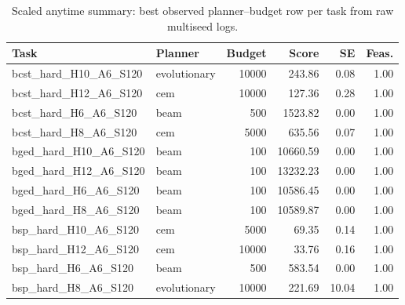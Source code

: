 \begin{table}[t]
\centering
\scriptsize
\caption{Scaled anytime summary: best observed planner--budget row per task from raw multiseed logs.}
\label{tab:scaling_anytime_bounds}
\begin{tabular}{llrrrr}
\toprule
Task & Planner & Budget & Score & SE & Feas. \\
\midrule
bcst\_hard\_H10\_A6\_S120 & evolutionary & 10000 & 243.86 & 0.08 & 1.00 \\
bcst\_hard\_H12\_A6\_S120 & cem & 10000 & 127.36 & 0.28 & 1.00 \\
bcst\_hard\_H6\_A6\_S120 & beam & 500 & 1523.82 & 0.00 & 1.00 \\
bcst\_hard\_H8\_A6\_S120 & cem & 5000 & 635.56 & 0.07 & 1.00 \\
bged\_hard\_H10\_A6\_S120 & beam & 100 & 10660.59 & 0.00 & 1.00 \\
bged\_hard\_H12\_A6\_S120 & beam & 100 & 13232.23 & 0.00 & 1.00 \\
bged\_hard\_H6\_A6\_S120 & beam & 100 & 10586.45 & 0.00 & 1.00 \\
bged\_hard\_H8\_A6\_S120 & beam & 100 & 10589.87 & 0.00 & 1.00 \\
bsp\_hard\_H10\_A6\_S120 & cem & 5000 & 69.35 & 0.14 & 1.00 \\
bsp\_hard\_H12\_A6\_S120 & cem & 10000 & 33.76 & 0.16 & 1.00 \\
bsp\_hard\_H6\_A6\_S120 & beam & 500 & 583.54 & 0.00 & 1.00 \\
bsp\_hard\_H8\_A6\_S120 & evolutionary & 10000 & 221.69 & 10.04 & 1.00 \\
\bottomrule
\end{tabular}
\end{table}
